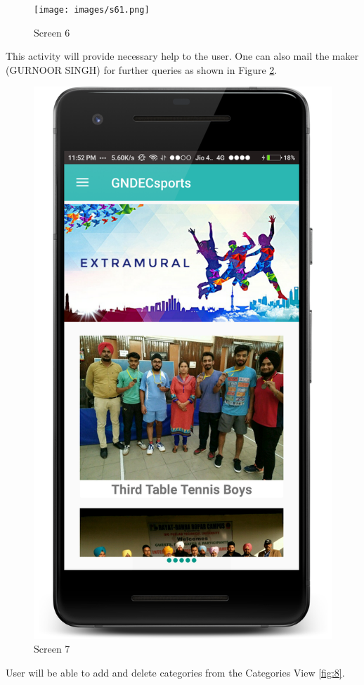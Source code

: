 \begin{figure}[ht]
\centering
\texttt{[image: images/s61.png]}
\caption{Screen 6}
\label{fig:6}
\end{figure}

\noindent This activity will provide necessary help to the user. One can also mail the maker
(GURNOOR SINGH) for further queries as shown in Figure \ref{fig:7}. 

\begin{figure}[ht]
\centering
\includegraphics[scale=0.38]{images/s7.png}
\caption{Screen 7}
\label{fig:7}
\end{figure}
\noindent User will be able to add and delete categories from the Categories View \ref{fig:8}. 

